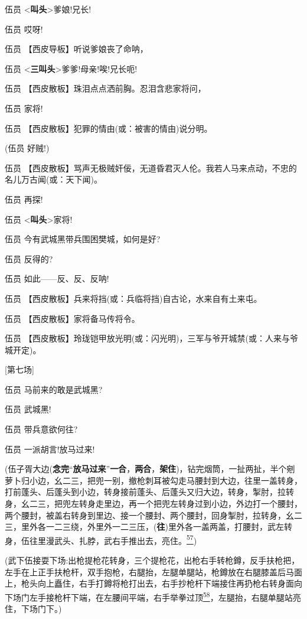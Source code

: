 伍员 \textless{}\textbf{叫头}\textgreater{}爹娘!兄长!

伍员 哎呀!

伍员 【西皮导板】听说爹娘丧了命呐，

伍员 \textless{}\textbf{三叫头}\textgreater{}爹爹!母亲!唉!兄长呃!

伍员 【西皮散板】珠泪点点洒前胸。忍泪含悲家将问，

伍员 家将!

伍员 【西皮散板】犯罪的情由(或：被害的情由)说分明。

(伍员 好贼!)

伍员
【西皮散板】骂声无极贼奸佞，无道昏君灭人伦。我若人马来点动，不忠的名儿万古闻(或：天下闻)。

伍员 再探!

伍员 \textless{}\textbf{叫头}\textgreater{}家将!

伍员 今有武城黑带兵围困樊城，如何是好?

伍员 反得的?

伍员 如此------反、反、反呐!

伍员 【西皮散板】兵来将挡(或：兵临将挡)自古论，水来自有土来屯。

伍员 【西皮散板】家将备马传将令。

伍员
【西皮散板】玲珑铠甲放光明(或：闪光明)，三军与爷开城禁(或：人来与爷城开定)。

{[}第七场{]}

伍员 马前来的敢是武城黑?

伍员 武城黑!

伍员 带兵意欲何往?

伍员 一派胡言!放马过来!

(伍子胥大边(\textbf{念完}``\textbf{放马过来}''\textbf{一合}，\textbf{两合}，\textbf{架住})，钻完烟筒，一扯两扯，半个剜萝卜归小边，幺二三，把兜一别，撤枪刺耳被勾走马腰封到大边，往里一盖转身，打前蓬头、后蓬头到小边，转身接前蓬头、后蓬头又归大边，转身，掣肘，拉转身，幺二三，把兜左转身走里边，再一个把兜左转身过到小边，外边打一个腰封，两个腰封，被盖右转身到里边、接一个腰封、两个腰封，回身掣肘，拉转身，幺二三，里外各一二三绕，外里外一二三压，(\textbf{往})里外各一盖两盖，打腰封，武左转身，伍往里漫武头、扎脖，武右手推出去，亮住。\protect\hyperlink{fn57}{\textsuperscript{57}})

(武下伍接耍下场:出枪提枪花转身，三个提枪花，出枪右手转枪鐏，反手扶枪把，左手在上正手扶枪杆，双手抱枪，右腿抬，左腿单腿站，枪鐏放在右腿膝盖后马面上，枪头向上矗住，右手打鐏将枪打出去，右手抄枪杆下端接住再扔枪右转身面向下场门左手接枪杆下端，在左腰间平端，右手举拳过顶\protect\hyperlink{fn58}{\textsuperscript{58}}，左腿抬，右腿单腿站亮住，下场门下。)

